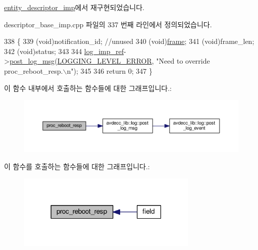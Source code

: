\hyperlink{classavdecc__lib_1_1entity__descriptor__imp_a8b3de398748e8299daf7296964f73c22}{entity\+\_\+descriptor\+\_\+imp}에서 재구현되었습니다.



descriptor\+\_\+base\+\_\+imp.\+cpp 파일의 337 번째 라인에서 정의되었습니다.


\begin{DoxyCode}
338 \{
339     (void)notification\_id; \textcolor{comment}{//unused}
340     (void)\hyperlink{gst__avb__playbin_8c_ac8e710e0b5e994c0545d75d69868c6f0}{frame};
341     (void)frame\_len;
342     (void)status;
343 
344     \hyperlink{namespaceavdecc__lib_acbe3e2a96ae6524943ca532c87a28529}{log\_imp\_ref}->\hyperlink{classavdecc__lib_1_1log_a68139a6297697e4ccebf36ccfd02e44a}{post\_log\_msg}(\hyperlink{namespaceavdecc__lib_a501055c431e6872ef46f252ad13f85cdaf2c4481208273451a6f5c7bb9770ec8a}{LOGGING\_LEVEL\_ERROR}, \textcolor{stringliteral}{"Need to
       override proc\_reboot\_resp.\(\backslash\)n"});
345 
346     \textcolor{keywordflow}{return} 0;
347 \}
\end{DoxyCode}


이 함수 내부에서 호출하는 함수들에 대한 그래프입니다.\+:
\nopagebreak
\begin{figure}[H]
\begin{center}
\leavevmode
\includegraphics[width=350pt]{classavdecc__lib_1_1descriptor__base__imp_a8b3de398748e8299daf7296964f73c22_cgraph}
\end{center}
\end{figure}




이 함수를 호출하는 함수들에 대한 그래프입니다.\+:
\nopagebreak
\begin{figure}[H]
\begin{center}
\leavevmode
\includegraphics[width=243pt]{classavdecc__lib_1_1descriptor__base__imp_a8b3de398748e8299daf7296964f73c22_icgraph}
\end{center}
\end{figure}


